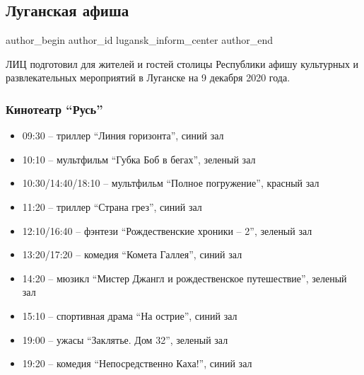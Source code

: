  
 
 
 
 
 
\subsection{Луганская афиша}
\label{sec:08_12_2020.news.lnr.lug_info.lugansk_inform_center.1.afisha}
\ifcmt
	author_begin
   author_id lugansk_inform_center
	author_end
\fi

ЛИЦ подготовил для жителей и гостей столицы Республики афишу культурных и
развлекательных мероприятий в Луганске на 9 декабря 2020 года.

\subsubsection{Кинотеатр \enquote{Русь}}

\begin{itemize}
  \item 09:30 – триллер \enquote{Линия горизонта}, синий зал
  \item 10:10 – мультфильм \enquote{Губка Боб в бегах}, зеленый зал
  \item 10:30/14:40/18:10 – мультфильм \enquote{Полное погружение}, красный зал
  \item 11:20 – триллер \enquote{Страна грез}, синий зал
  \item 12:10/16:40 – фэнтези \enquote{Рождественские хроники – 2}, зеленый зал
  \item 13:20/17:20 – комедия \enquote{Комета Галлея}, синий зал
  \item 14:20 – мюзикл \enquote{Мистер Джангл и рождественское путешествие}, зеленый зал
  \item 15:10 – спортивная драма \enquote{На острие}, синий зал
  \item 19:00 – ужасы \enquote{Заклятье. Дом 32}, зеленый зал
  \item 19:20 – комедия \enquote{Непосредственно Каха!}, синий зал
\end{itemize}

